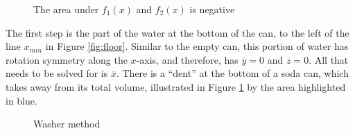 \documentclass[11pt]{article}
\begin{document}
    \begin{figure}
        \centering
        \vspace{-10pt}
        \caption{The area under $f_1(x)$ and $f_2(x)$ is negative}
        \label{fig:negative-area}
    \end{figure}

    The first step is the part of the water at the bottom of the can, to the left of the line $x_{min}$ in Figure \ref{fig:floor}. Similar to the empty can, this portion of water has rotation symmetry along the $x$-axis, and therefore, has $\overline{y} = 0$ and $\overline{z} = 0$. All that needs to be solved for is $\overline{x}$. There is a ``dent'' at the bottom of a soda can, which takes away from its total volume, illustrated in Figure \ref{fig:negative-area} by the area highlighted in blue.

    \begin{figure}
        \centering
        \vspace{-10pt}
        \caption{Washer method}
        \label{fig:washer-method}
    \end{figure}
\end{document}

